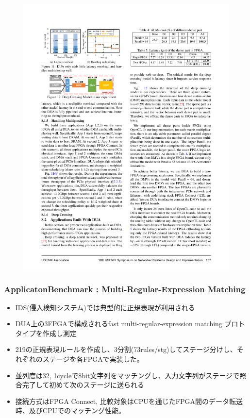 \documentclass[dvipdfmx,9pt,notheorems]{beamer}
\theoremstyle{definition}
\begin{document}
\begin{frame}
\begin{figure}[htb]
		\includegraphics[scale=1.0]{fig/table5.pdf}
  \end{figure}
\pnote{
}
\end{frame}

\begin{frame}\frametitle{ApplicatonBenchmark : Multi-Regular-Expression Matching}
	\begin{itemize}
		\item IDS(侵入検知システム)では典型的に正規表現が利用される
    \item DUA上の3FPGAで構成されるfast multi-regular-expression matching プロトタイプを作成し測定
		\item 219の正規表現ルールを作成し、3分割(73rules/stg)してステージ分けし、それぞれのステージを各FPGAで実装した。
		\item 並列度は32, 1cycleで8bit文字列をマッチングし、入力文字列がステージで照合完了して初めて次のステージに送られる
		\item 接続方式はFPGA Connect, 比較対象はCPUを通じたFPGA間のデータ転送時、及びCPUでのマッチング性能。
	\end{itemize}
\pnote{
}
\end{frame}
\end{document}
